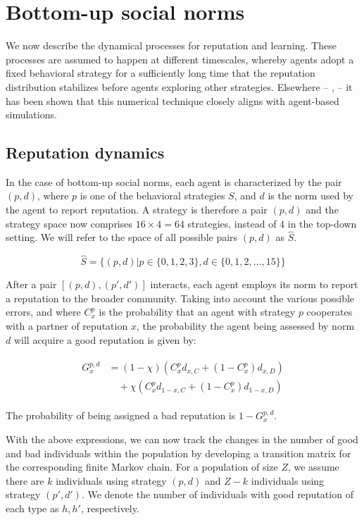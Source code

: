 \documentclass[sigconf]{aamas}  %
\begin{document}
\section{Bottom-up social norms\label{bottomup}}

We now describe the dynamical processes for reputation and learning. These processes are assumed to happen at different timescales, whereby agents adopt a fixed behavioral strategy for a sufficiently long time that the reputation distribution stabilizes before agents exploring other strategies. Elsewhere -- \cite{Santos2016}, \cite{santos_social_2018}  -- it has been shown that this numerical technique closely aligns with agent-based simulations.


\subsection{Reputation dynamics}

In the case of bottom-up social norms, each agent is characterized by the pair $(p,d)$, where $p$ is one of the behavioral strategies $S$, and $d$ is the norm used by the agent to report reputation. A strategy is therefore a pair $(p, d)$ and the strategy space now comprises $16 \times 4 = 64$ strategies, instead of $4$ in the top-down setting. We will refer to the space of all possible pairs $(p, d)$ as $\hat{S}$. 

$$\hat{S} = \{(p, d) | p \in \{0, 1, 2, 3\}, d \in \{0, 1, 2, \dots, 15\}  \}$$


After a pair $[(p, d), (p', d')]$ interacts, each agent employs its norm to report a reputation to the broader community. Taking into account the various possible errors, and where $C^p_x$ is the probability that an agent with strategy $p$ cooperates with a partner of reputation $x$, the probability the agent being assessed by norm $d$ will acquire a good reputation is given by:

\begin{align*}
	\begin{split}
		G^{p,d}_{x} & =  (1-\chi)(C_{x}^{p}d_{x,C}+(1-C_{x}^{p})d_{x,D}) \\ & \quad {} + \chi(C_{x}^{p}d_{1-x,C}+(1-C_{x}^{p})d_{1-x,D})
	\end{split}
\end{align*}

The probability of being assigned a bad reputation is $1-G^{p,d}_{x}$. 

With the above expressions, we can now track the changes in the number of good and bad individuals within the population by developing a transition matrix for the corresponding finite Markov chain. For a population of size $Z$, we assume there are $k$ individuals using strategy $(p,d)$ and $Z-k$ individuals using strategy $(p',d')$. We denote the number of individuals with good reputation of each type as $h, h'$, respectively.
\end{document}
